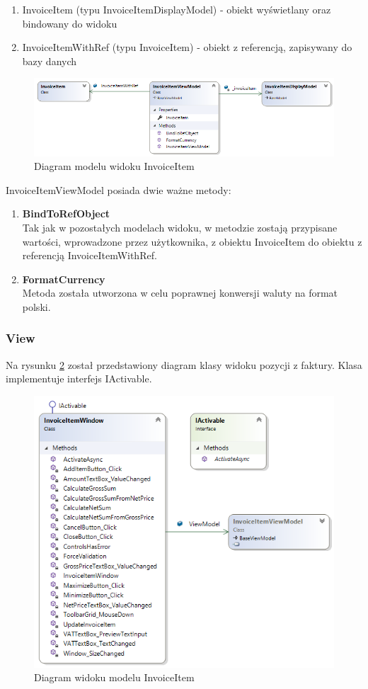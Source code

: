 \begin{enumerate}
    \item InvoiceItem (typu InvoiceItemDisplayModel) - obiekt wyświetlany oraz bindowany do widoku
    \item InvoiceItemWithRef (typu InvoiceItem) - obiekt z referencją, zapisywany do bazy danych
\end{enumerate}

\begin{figure}[ht!]
  \includegraphics[width=\linewidth]{Rysunki/InvoiceItemViewModelDiagram.png}
  \caption{Diagram modelu widoku InvoiceItem}
  \label{fig:InvoiceItemDiagram}
\end{figure}

InvoiceItemViewModel posiada dwie ważne metody:

\begin{enumerate}
    \item \textbf{BindToRefObject} \\
    Tak jak w pozostałych modelach widoku, w metodzie zostają przypisane wartości, wprowadzone przez użytkownika, z obiektu InvoiceItem do obiektu z referencją InvoiceItemWithRef. 
    \item \textbf{FormatCurrency} \\
    Metoda została utworzona w celu poprawnej konwersji waluty na format polski.
\end{enumerate}

\subsubsection{View}
Na rysunku \ref{fig:InvoiceItemWindowDiagram} został przedstawiony diagram klasy widoku pozycji z faktury. Klasa implementuje interfejs IActivable. 

\begin{figure}[ht!]
\centering
  \includegraphics[width=0.7\linewidth]{Rysunki/InvoiceItemWindowDiagram.png}
  \caption{Diagram widoku modelu InvoiceItem}
  \label{fig:InvoiceItemWindowDiagram}
\end{figure}

